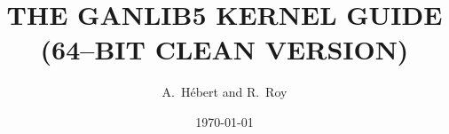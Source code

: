\documentclass{report}
\begin{document}
\title{THE GANLIB5 KERNEL GUIDE \\(64--BIT CLEAN VERSION)}

\author{A.~H\'ebert and R.~Roy}

\date{\today}



\tableofcontents

\Debutdutexte


\clearpage
{}

\clearpage
{}
\printindex
\end{document}
